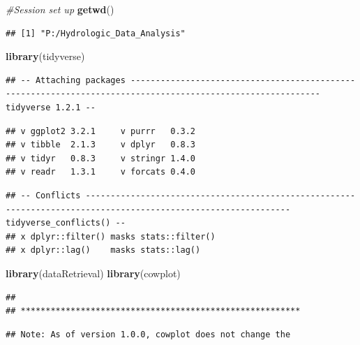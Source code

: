 \documentclass[]{article}
\newenvironment{Shaded}{\begin{snugshade}}{\end{snugshade}}
\newcommand{\CommentTok}[1]{\textcolor[rgb]{0.56,0.35,0.01}{\textit{#1}}}
\newcommand{\KeywordTok}[1]{\textcolor[rgb]{0.13,0.29,0.53}{\textbf{#1}}}
\newcommand{\NormalTok}[1]{#1}
\begin{document}
\begin{Shaded}
\begin{Highlighting}[]
\CommentTok{#Session set up}
\KeywordTok{getwd}\NormalTok{()}
\end{Highlighting}
\end{Shaded}

\begin{verbatim}
## [1] "P:/Hydrologic_Data_Analysis"
\end{verbatim}

\begin{Shaded}
\begin{Highlighting}[]
\KeywordTok{library}\NormalTok{(tidyverse)}
\end{Highlighting}
\end{Shaded}

\begin{verbatim}
## -- Attaching packages ------------------------------------------------------------------------------------------------------------ tidyverse 1.2.1 --
\end{verbatim}

\begin{verbatim}
## v ggplot2 3.2.1     v purrr   0.3.2
## v tibble  2.1.3     v dplyr   0.8.3
## v tidyr   0.8.3     v stringr 1.4.0
## v readr   1.3.1     v forcats 0.4.0
\end{verbatim}

\begin{verbatim}
## -- Conflicts --------------------------------------------------------------------------------------------------------------- tidyverse_conflicts() --
## x dplyr::filter() masks stats::filter()
## x dplyr::lag()    masks stats::lag()
\end{verbatim}

\begin{Shaded}
\begin{Highlighting}[]
\KeywordTok{library}\NormalTok{(dataRetrieval)}
\KeywordTok{library}\NormalTok{(cowplot)}
\end{Highlighting}
\end{Shaded}

\begin{verbatim}
## 
## ********************************************************
\end{verbatim}

\begin{verbatim}
## Note: As of version 1.0.0, cowplot does not change the
\end{verbatim}
\end{document}

